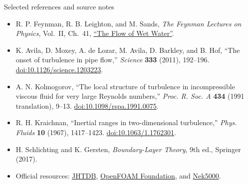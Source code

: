 \documentclass[aspectratio=169,11pt]{beamer}
\begin{document}
\begin{frame}{Selected references and source notes}
\scriptsize
\begin{itemize}
  \item R. P. Feynman, R. B. Leighton, and M. Sands, \emph{The Feynman Lectures on Physics}, Vol.~II, Ch.~41, \href{https://www.feynmanlectures.caltech.edu/II_41.html}{``The Flow of Wet Water''}.
  \item K. Avila, D. Moxey, A. de Lozar, M. Avila, D. Barkley, and B. Hof, ``The onset of turbulence in pipe flow,'' \emph{Science} \textbf{333} (2011), 192--196. \href{https://doi.org/10.1126/science.1203223}{doi:10.1126/science.1203223}.
  \item A. N. Kolmogorov, ``The local structure of turbulence in incompressible viscous fluid for very large Reynolds numbers,'' \emph{Proc. R. Soc. A} \textbf{434} (1991 translation), 9--13. \href{https://doi.org/10.1098/rspa.1991.0075}{doi:10.1098/rspa.1991.0075}.
  \item R. H. Kraichnan, ``Inertial ranges in two-dimensional turbulence,'' \emph{Phys. Fluids} \textbf{10} (1967), 1417--1423. \href{https://doi.org/10.1063/1.1762301}{doi:10.1063/1.1762301}.
  \item H. Schlichting and K. Gersten, \emph{Boundary-Layer Theory}, 9th ed., Springer (2017).
  \item Official resources: \href{https://turbulence.pha.jhu.edu/}{JHTDB}, \href{https://openfoam.org/}{OpenFOAM Foundation}, and \href{https://nek5000.mcs.anl.gov/}{Nek5000}.
\end{itemize}
\end{frame}
\end{document}
